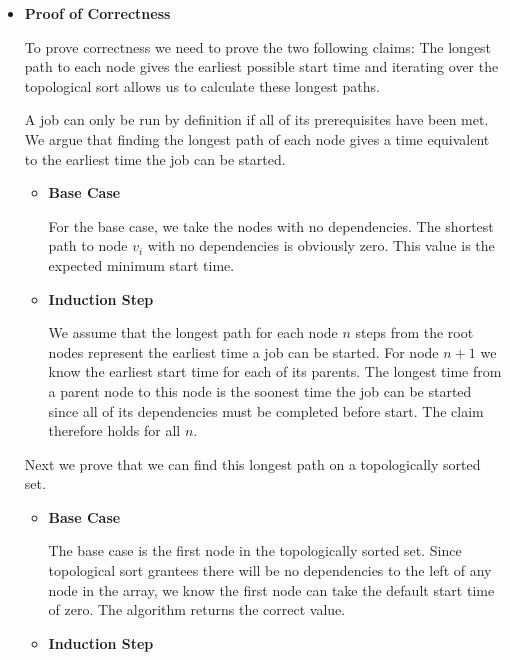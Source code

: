 \documentclass[letterpaper,11pt]{article}
\begin{document}
\begin{itemize}
    \item \textbf{Proof of Correctness}

        To prove correctness we need to prove the two following claims: The 
        longest path to each node gives the earliest possible start time and 
        iterating over the topological sort allows us to calculate these 
        longest paths.

        A job can only be run by definition if all of its prerequisites have 
        been met. We argue that finding the longest path of each node gives
        a time equivalent to the earliest time the job can be started.
        \begin{itemize}
            \item \textbf{Base Case}

                For the base case, we take the nodes with no dependencies. The 
                shortest path to node $v_i$ with no dependencies is obviously
                zero. This value is the expected minimum start time.

            \item \textbf{Induction Step}

                We assume that the longest path for each node $n$ steps from
                the root nodes represent the earliest time a job can be started.
                For node $n+1$ we know the earliest start time for each of its 
                parents.  The longest time from a parent node to this node is 
                the soonest time the job can be started since all of its 
                dependencies must be completed before start. The claim therefore
                holds for all $n$.

        \end{itemize}

        Next we prove that we can find this longest path on a topologically 
        sorted set. 
         \begin{itemize}
             \item \textbf{Base Case}

                 The base case is the first node in the topologically sorted
                 set. Since topological sort grantees there will be no 
                 dependencies to the left of any node in the array, we know 
                 the first node can take the default start time of zero. The 
                 algorithm returns the correct value. 

             \item \textbf{Induction Step}


\end{itemize}
\end{itemize}
\end{document}
